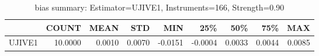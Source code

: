 \begin{table}[ht]
\centering
\caption{bias summary: Estimator=UJIVE1, Instruments=166, Strength=0.90}
\begin{tabular}{lrrrrrrrr}
\toprule
 & COUNT & MEAN & STD & MIN & 25\% & 50\% & 75\% & MAX \\
\midrule
UJIVE1 & 10.0000 & 0.0010 & 0.0070 & -0.0151 & -0.0004 & 0.0033 & 0.0044 & 0.0085 \\
\bottomrule
\end{tabular}
\end{table}
